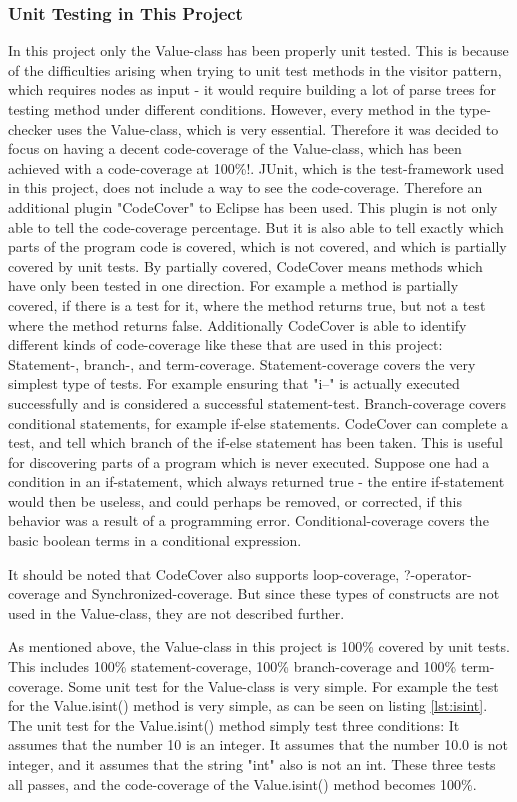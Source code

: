 \subsubsection{Unit Testing in This Project}
In this project only the Value-class has been properly unit tested. This is because of the difficulties arising when trying to unit test methods in the visitor pattern, which requires nodes as input - it would require building a lot of parse trees for testing method under different conditions. However, every method in the type-checker uses the Value-class, which is very essential. Therefore it was decided to focus on having a decent code-coverage of the Value-class, which has been achieved with a code-coverage at 100\%!. JUnit, which is the test-framework used in this project, does not include a way to see the code-coverage. Therefore an additional plugin "CodeCover" \citep{codecover} to Eclipse has been used. This plugin is not only able to tell the code-coverage percentage. But it is also able to tell exactly which parts of the program code is covered, which is not covered, and which is partially covered by unit tests. By partially covered, CodeCover means methods which have only been tested in one direction. For example a method is partially covered, if there is a test for it, where the method returns true, but not a test where the method returns false. Additionally CodeCover is able to identify different kinds of code-coverage like these that are used in this project: Statement-, branch-, and term-coverage. Statement-coverage covers the very simplest type of tests. For example ensuring that "i--" is actually executed successfully and is considered a successful statement-test.
Branch-coverage covers conditional statements, for example if-else statements. CodeCover can complete a test, and tell which branch of the if-else statement has been taken. This is useful for discovering parts of a program which is never executed. Suppose one had a condition in an if-statement, which always returned true - the entire if-statement would then be useless, and could perhaps be removed, or corrected, if this behavior was a result of a programming error. Conditional-coverage covers the basic boolean terms in a conditional expression. 

It should be noted that CodeCover also supports loop-coverage, ?-operator-coverage and Synchronized-coverage. But since these types of constructs are not used in the Value-class, they are not described further. 

As mentioned above, the Value-class in this project is 100\% covered by unit tests. This includes 100\% statement-coverage, 100\% branch-coverage and 100\% term-coverage. Some unit test for the Value-class is very simple. For example the test for the Value.isint() method is very simple, as can be seen on listing \ref{lst:isint}. The unit test for the Value.isint() method simply test three conditions: It assumes that the number 10 is an integer. It assumes that the number 10.0 is not integer, and it assumes that the string "int" also is not an int. These three tests all passes, and the code-coverage of the Value.isint() method becomes 100\%. 

